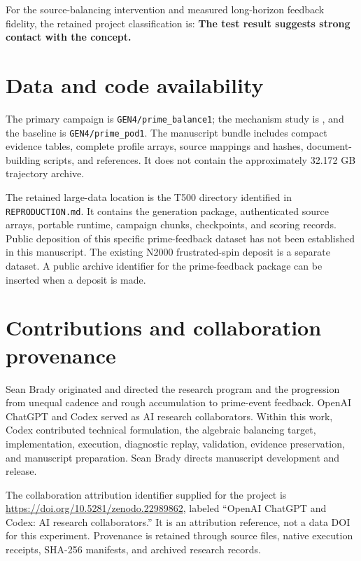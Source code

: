 \documentclass[
  11pt,
]{article}
\begin{document}
For the source-balancing intervention and measured long-horizon feedback
fidelity, the retained project classification is: \textbf{The test
result suggests strong contact with the concept.}

\section{Data and code availability}\label{data-and-code-availability}

The primary campaign is \texttt{GEN4/prime\_balance1}; the mechanism
study is \texttt{}, and the baseline is
\texttt{GEN4/prime\_pod1}. The manuscript bundle includes compact
evidence tables, complete profile arrays, source mappings and hashes,
document-building scripts, and references. It does not contain the
approximately 32.172 GB trajectory archive.

The retained large-data location is the T500 directory identified in
\texttt{REPRODUCTION.md}. It contains the generation package,
authenticated source arrays, portable runtime, campaign chunks,
checkpoints, and scoring records. Public deposition of this specific
prime-feedback dataset has not been established in this manuscript. The
existing N2000 frustrated-spin deposit is a separate dataset. A public
archive identifier for the prime-feedback package can be inserted when a
deposit is made.

\section{Contributions and collaboration
provenance}\label{contributions-and-collaboration-provenance}

Sean Brady originated and directed the research program and the
progression from unequal cadence and rough accumulation to prime-event
feedback. OpenAI ChatGPT and Codex served as AI research collaborators.
Within this work, Codex contributed technical formulation, the algebraic
balancing target, implementation, execution, diagnostic replay,
validation, evidence preservation, and manuscript preparation. Sean
Brady directs manuscript development and release.

The collaboration attribution identifier supplied for the project is
\url{https://doi.org/10.5281/zenodo.22989862}, labeled ``OpenAI ChatGPT
and Codex: AI research collaborators.'' It is an attribution reference,
not a data DOI for this experiment. Provenance is retained through
source files, native execution receipts, SHA-256 manifests, and archived
research records.
\end{document}

